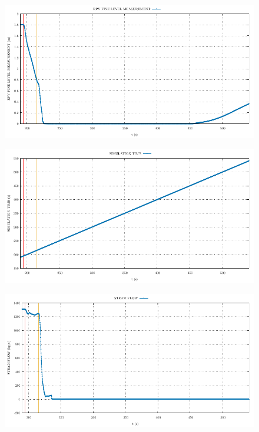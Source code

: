 \documentclass{article}
\begin{document}
\begin{multicols}{2}
\begin{figure}[H]
\end{figure}
\begin{figure}[H]
\centering
\includegraphics[width=\linewidth]{./graphs/RPV FINE LEVEL MEASUREMENT_comp.pdf}
\end{figure}
\begin{figure}[H]
\centering
\includegraphics[width=\linewidth]{./graphs/SIMULATION TIME_comp.pdf}
\end{figure}
\begin{figure}[H]
\centering
\includegraphics[width=\linewidth]{./graphs/STEAM FLOW_comp.pdf}

\end{figure}
\end{multicols}
\end{document}
